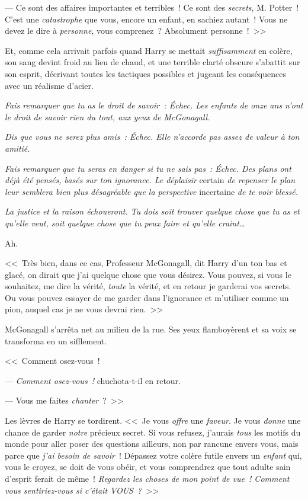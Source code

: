 --- Ce sont des affaires importantes et terribles~! Ce sont des \emph{secrets}, M. Potter~! C'est une \emph{catastrophe} que vous, encore un enfant, en sachiez autant~! Vous ne devez le dire à \emph{personne}, vous comprenez~? Absolument personne~!~>>

Et, comme cela arrivait parfois quand Harry se mettait \emph{suffisamment} en colère, son sang devint froid au lieu de chaud, et une terrible clarté obscure s'abattit sur son esprit, décrivant toutes les tactiques possibles et jugeant les conséquences avec un réalisme d'acier.

\emph{Fais remarquer que tu as le droit de savoir~: Échec. Les enfants de onze ans n'ont le droit de savoir rien du tout, aux yeux de McGonagall.}

\emph{Dis que vous ne serez plus amis~: Échec. Elle n'accorde pas assez de valeur à ton amitié.}

\emph{Fais remarquer que tu seras en danger si tu ne sais pas~: Échec. Des plans ont déjà été pensés, basés sur ton ignorance. Le déplaisir} certain \emph{de repenser le plan leur semblera bien plus désagréable que la perspective} incertaine \emph{de te voir blessé.}

\emph{La justice et la raison échoueront. Tu dois soit trouver quelque chose que tu as et qu'elle veut, soit quelque chose que tu peux faire et qu'elle craint…}

Ah.

<<~Très bien, dans ce cas, Professeur McGonagall, dit Harry d'un ton bas et glacé, on dirait que j'ai quelque chose que vous désirez. Vous pouvez, si vous le souhaitez, me dire la vérité, \emph{toute} la vérité, et en retour je garderai vos secrets. Ou vous pouvez essayer de me garder dans l'ignorance et m'utiliser comme un pion, auquel cas je ne vous devrai rien.~>>

McGonagall s'arrêta net au milieu de la rue. Ses yeux flamboyèrent et sa voix se transforma en un sifflement.

<<~Comment osez-vous~!

--- \emph{Comment osez-vous~!} chuchota-t-il en retour.

--- Vous me faites \emph{chanter}~?~>>

Les lèvres de Harry se tordirent. <<~Je vous \emph{offre} une \emph{faveur}. Je vous \emph{donne} une chance de garder \emph{notre} précieux secret. Si vous refusez, j'aurais \emph{tous} les motifs du monde pour aller poser des questions ailleurs, non par rancune envers vous, mais parce que \emph{j'ai besoin de savoir}~! Dépassez votre colère futile envers un \emph{enfant} qui, vous le croyez, se doit de vous obéir, et vous comprendrez que tout adulte sain d'esprit ferait de même~! \emph{Regardez les choses de mon point de vue~! Comment vous sentiriez-vous si c'était VOUS~?}~>>

